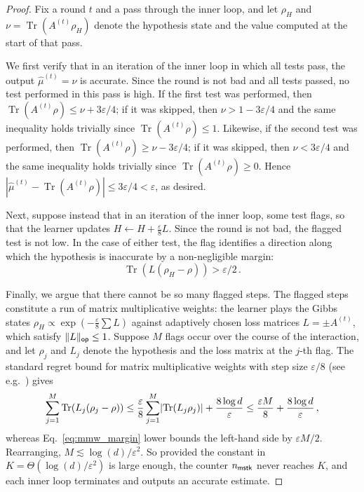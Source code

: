 \documentclass[10pt]{article}
\DeclarePairedDelimiter\abs{\lvert}{\rvert}
\DeclarePairedDelimiter\norm{\lVert}{\rVert}
\renewcommand{\epsilon}{\varepsilon}
\DeclareMathOperator{\Tr}{Tr}
\begin{document}
\begin{proof}
    Fix a round $t$ and a pass through the inner loop, and let $\rho_H$ and $\nu = \Tr(A^{(t)}\rho_H)$ denote the hypothesis state and the value computed at the start of that pass.
    
    We first verify that in an iteration of the inner loop in which all tests pass, the output $\widehat{\mu}^{(t)} = \nu$ is accurate. Since the round is not bad and all tests passed, no test performed in this pass is high. If the first test was performed, then $\Tr(A^{(t)}\rho) \le \nu + 3\epsilon/4$; if it was skipped, then $\nu > 1 - 3\epsilon/4$ and the same inequality holds trivially since $\Tr(A^{(t)}\rho)\le 1$. Likewise, if the second test was performed, then $\Tr(A^{(t)}\rho)\ge \nu - 3\epsilon/4$; if it was skipped, then $\nu < 3\epsilon/4$ and the same inequality holds trivially since $\Tr(A^{(t)}\rho)\ge 0$. Hence $|\widehat{\mu}^{(t)} - \Tr(A^{(t)}\rho)| \le 3\epsilon/4 < \epsilon$, as desired.

    Next, suppose instead that in an iteration of the inner loop, some test flags, so that the learner updates $H \gets H + \frac{\epsilon}{8} L$. Since the round is not bad, the flagged test is not low. In the case of either test, the flag identifies a direction along which the hypothesis is inaccurate by a non-negligible margin:
    \begin{equation}
        \Tr(L(\rho_H - \rho)) > \epsilon/2\,. \label{eq:mmw_margin}
    \end{equation}
    
    Finally, we argue that there cannot be so many flagged steps. The flagged steps constitute a run of matrix multiplicative weights: the learner plays the Gibbs states $\rho_H \propto \exp(-\frac{\epsilon}{8}\sum L)$ against adaptively chosen loss matrices $L = \pm A^{(t)}$, which satisfy $\norm{L}_{\sf op}\le 1$. Suppose $M$ flags occur over the course of the interaction, and let $\rho_j$ and $L_j$ denote the hypothesis and the loss matrix at the $j$-th flag. The standard regret bound for matrix multiplicative weights with step size $\epsilon/8$ (see e.g.~\cite[Corollary 3]{kale2007efficient}) gives
    \begin{equation}
        \sum^M_{j=1}\Tr(L_j(\rho_j - \rho)) \le \frac{\epsilon}{8}\sum^M_{j=1} \abs{\Tr(L_j\rho_j)} + \frac{8\log d}{\epsilon} \le \frac{\epsilon M}{8} + \frac{8\log d}{\epsilon}\,,
    \end{equation}
    whereas Eq.~\eqref{eq:mmw_margin} lower bounds the left-hand side by $\epsilon M/2$. Rearranging, $M \lesssim \log(d)/\epsilon^2$. So provided the constant in $K = \Theta(\log(d)/\epsilon^2)$ is large enough, the counter $n_{\sf mstk}$ never reaches $K$, and each inner loop terminates and outputs an accurate estimate.
\end{proof}
\end{document}
